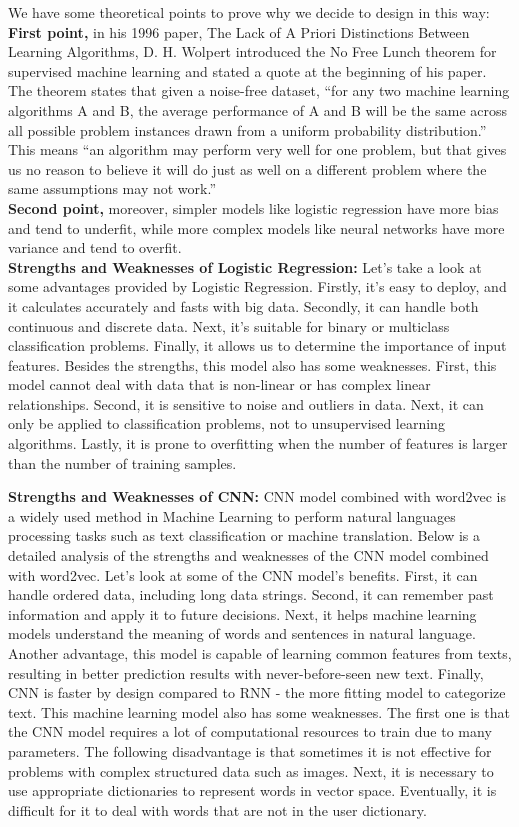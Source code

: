 We have some theoretical points to prove why we decide to design in this way: \\
\textbf{First point,} in his 1996 paper, The Lack of A Priori Distinctions Between Learning Algorithms, D. H. Wolpert introduced the No Free Lunch theorem for supervised machine learning and stated a quote at the beginning of his paper. The theorem states that given a noise-free dataset, “for any two machine learning algorithms A and B, the average performance of A and B will be the same across all possible problem instances drawn from a uniform probability distribution.” This means  “an algorithm may perform very well for one problem, but that gives us no reason to believe it will do just as well on a different problem where the same assumptions may not work.” \\
\textbf{Second point,} moreover, simpler models like logistic regression have more bias and tend to underfit, while more complex models like neural networks have more variance and tend to overfit. \\
\textbf{Strengths and Weaknesses of Logistic Regression:} 
Let's take a look at some advantages provided by Logistic Regression. Firstly, it's easy to deploy, and it calculates accurately and fasts with big data. Secondly, it can handle both continuous and discrete data. Next, it's suitable for binary or multiclass classification problems. Finally, it allows us to determine the importance of input features. Besides the strengths, this model also has some weaknesses.
First, this model cannot deal with data that is non-linear or has complex linear relationships. Second, it is sensitive to noise and outliers in data. Next, it can only be applied to classification problems, not to unsupervised learning algorithms. Lastly, it is prone to overfitting when the number of features is larger than the number of training samples.

\textbf{Strengths and Weaknesses of CNN:} 
CNN model combined with word2vec is a widely used method in Machine Learning to perform natural languages processing tasks such as text classification or machine translation. Below is a detailed analysis of the strengths and weaknesses of the CNN model combined with word2vec.
Let's look at some of the CNN model's benefits. First, it can handle ordered data, including long data strings. Second, it can remember past information and apply it to future decisions. Next, it helps machine learning models understand the meaning of words and sentences in natural language. Another advantage, this model is capable of learning common features from texts, resulting in better prediction results with never-before-seen new text. Finally, CNN is faster by design compared to RNN - the more fitting model to categorize text. This machine learning model also has some weaknesses. The first one is that the CNN model requires a lot of computational resources to train due to many parameters. The following disadvantage is that sometimes it is not effective for problems with complex structured data such as images. Next, it is necessary to use appropriate dictionaries to represent words in vector space. Eventually, it is difficult for it to deal with words that are not in the user dictionary. 

